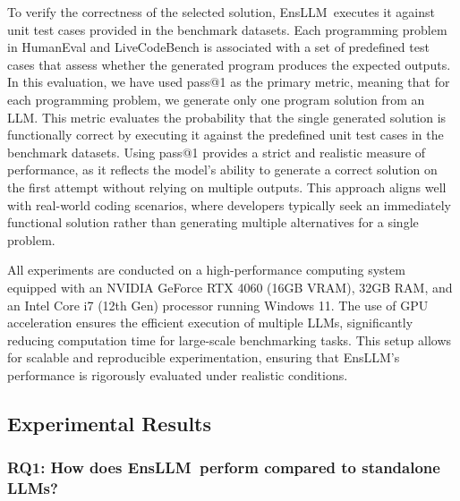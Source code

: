 \documentclass{article}
\newcommand{\tool}{EnsLLM}
\begin{document}
To verify the correctness of the selected solution, \tool\ executes it against unit test cases provided in the benchmark datasets. Each programming problem in HumanEval and LiveCodeBench is associated with a set of predefined test cases that assess whether the generated program produces the expected outputs. In this evaluation, we have used pass@1 as the primary metric, meaning that for each programming problem, we generate only one program solution from an LLM. This metric evaluates the probability that the single generated solution is functionally correct by executing it against the predefined unit test cases in the benchmark datasets. Using pass@1 provides a strict and realistic measure of performance, as it reflects the model's ability to generate a correct solution on the first attempt without relying on multiple outputs. This approach aligns well with real-world coding scenarios, where developers typically seek an immediately functional solution rather than generating multiple alternatives for a single problem.

All experiments are conducted on a high-performance computing system equipped with an NVIDIA GeForce RTX 4060 (16GB VRAM), 32GB RAM, and an Intel Core i7 (12th Gen) processor running Windows 11. The use of GPU acceleration ensures the efficient execution of multiple LLMs, significantly reducing computation time for large-scale benchmarking tasks. This setup allows for scalable and reproducible experimentation, ensuring that \tool’s performance is rigorously evaluated under realistic conditions.


\subsection{Experimental Results}

\subsubsection{RQ1: How does \tool\ perform compared to standalone LLMs?} 
\end{document}
